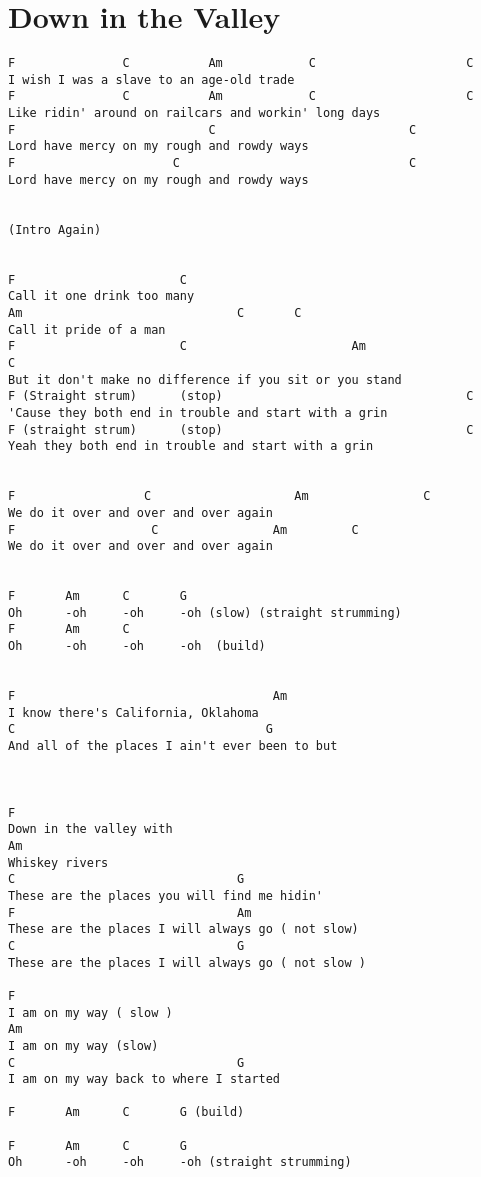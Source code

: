 \documentclass[leqno]{memoir}
\begin{document}
\chapter{Down in the Valley}
\begin{verbatim}
F               C           Am            C                     C
I wish I was a slave to an age-old trade
F               C           Am            C                     C
Like ridin' around on railcars and workin' long days
F                           C                           C
Lord have mercy on my rough and rowdy ways
F                      C                                C
Lord have mercy on my rough and rowdy ways


(Intro Again)


F                       C               
Call it one drink too many
Am                              C       C
Call it pride of a man
F                       C                       Am                              C
But it don't make no difference if you sit or you stand
F (Straight strum)      (stop)                                  C
'Cause they both end in trouble and start with a grin
F (straight strum)      (stop)                                  C
Yeah they both end in trouble and start with a grin


F                  C                    Am                C
We do it over and over and over again
F                   C                Am         C
We do it over and over and over again

 
F       Am      C       G
Oh      -oh     -oh     -oh (slow) (straight strumming)
F       Am      C       
Oh      -oh     -oh     -oh  (build)


F                                    Am
I know there's California, Oklahoma
C                                   G
And all of the places I ain't ever been to but



F
Down in the valley with
Am
Whiskey rivers
C                               G
These are the places you will find me hidin'
F                               Am      
These are the places I will always go ( not slow)
C                               G
These are the places I will always go ( not slow ) 

F
I am on my way ( slow )
Am
I am on my way (slow)
C                               G
I am on my way back to where I started

F       Am      C       G (build)

F       Am      C       G
Oh      -oh     -oh     -oh (straight strumming)



\end{verbatim}
\end{document}
